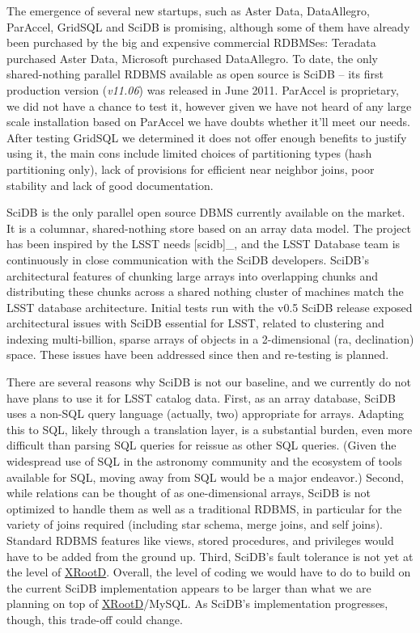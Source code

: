 \documentclass[DM,lsstdraft,toc]{lsstdoc}
\begin{document}
The emergence of several new startups, such as Aster Data, DataAllegro,
ParAccel, GridSQL and SciDB is promising, although some of them have
already been purchased by the big and expensive commercial RDBMSes:
Teradata purchased Aster Data, Microsoft purchased DataAllegro. To date,
the only shared-nothing parallel RDBMS available as open source is SciDB
-- its first production version (\emph{v11.06}) was released in June
2011. ParAccel is proprietary, we did not have a chance to test it,
however given we have not heard of any large scale installation based on
ParAccel we have doubts whether it'll meet our needs. After testing
GridSQL we determined it does not offer enough benefits to justify using
it, the main cons include limited choices of partitioning types (hash
partitioning only), lack of provisions for efficient near neighbor
joins, poor stability and lack of good documentation.

SciDB is the only parallel open source DBMS currently available on the
market. It is a columnar, shared-nothing store based on an array data
model. The project has been inspired by the LSST needs {[}scidb{]}\_,
and the LSST Database team is continuously in close communication with
the SciDB developers. SciDB's architectural features of chunking large
arrays into overlapping chunks and distributing these chunks across a
shared nothing cluster of machines match the LSST database architecture.
Initial tests run with the v0.5 SciDB release exposed architectural
issues with SciDB essential for LSST, related to clustering and indexing
multi-billion, sparse arrays of objects in a 2-dimensional (ra,
declination) space. These issues have been addressed since then and
re-testing is planned.

There are several reasons why SciDB is not our baseline, and we
currently do not have plans to use it for LSST catalog data. First, as
an array database, SciDB uses a non-SQL query language (actually, two)
appropriate for arrays. Adapting this to SQL, likely through a
translation layer, is a substantial burden, even more difficult than
parsing SQL queries for reissue as other SQL queries. (Given the
widespread use of SQL in the astronomy community and the ecosystem of
tools available for SQL, moving away from SQL would be a major
endeavor.) Second, while relations can be thought of as one-dimensional
arrays, SciDB is not optimized to handle them as well as a traditional
RDBMS, in particular for the variety of joins required (including star
schema, merge joins, and self joins). Standard RDBMS features like
views, stored procedures, and privileges would have to be added from the
ground up. Third, SciDB's fault tolerance is not yet at the level of
\href{http://xrootd.org}{XRootD}. Overall, the level of coding we would
have to do to build on the current SciDB implementation appears to be
larger than what we are planning on top of
\href{http://xrootd.org}{XRootD}/MySQL. As SciDB's implementation
progresses, though, this trade-off could change.
\end{document}
